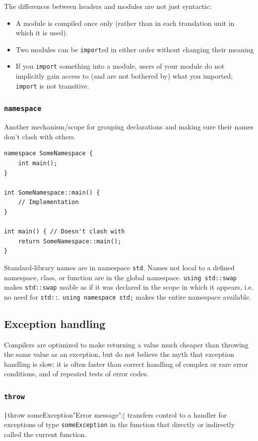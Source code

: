 \documentclass[table, xcdraw]{article}%
\begin{document}
The differences between headers and modules are not just syntactic:
\begin{itemize}[leftmargin=15pt,noitemsep,nolistsep]
\item A module is compiled once only (rather than in each translation unit in which it is used).
\item Two modules can be \texttt{import}ed in either order without changing their meaning
\item If you \texttt{import} something into a module, users of your module do not implicitly gain access to (and are not bothered by) what you imported;  \texttt{import} is not transitive.
\end{itemize}

\subsubsection{\texttt{namespace}} \label{namespace}
Another mechanism/scope for grouping declarations and making sure their names don't clash with others.

\begin{verbatim}
namespace SomeNamespace {
    int main();
}

int SomeNamespace::main() {
    // Implementation
}

int main() { // Doesn't clash with 
    return SomeNamespace::main();
}
\end{verbatim}

Standard-library names are in namespace \texttt{std}. Names not local to a defined namespace, class, or function are in the global namespace. \texttt{using std::swap} makes \texttt{std::swap} usable as if it was declared in the scope in which it appears, i.e. no need for \texttt{std::}. \texttt{using namespace std;} makes the entire namespace available.

\subsection{Exception handling}
Compilers are optimized to make returning a value much cheaper than throwing the same value as an exception, but do not believe the myth that exception handling is slow; it is often faster than correct handling of complex or rare error conditions, and of repeated tests of error codes.

\subsubsection{\texttt{throw}}
\texttt|throw someException{"Error message"};| transfers control to a handler for exceptions of type \texttt{someException} in the function that directly or indirectly called the current function.\\
\end{document}
